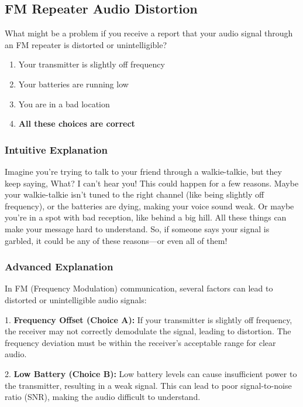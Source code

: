 \subsection{FM Repeater Audio Distortion}
\label{T7B10}

\begin{tcolorbox}[colback=gray!10!white,colframe=black!75!black,title=T7B10]
What might be a problem if you receive a report that your audio signal through an FM repeater is distorted or unintelligible?
\begin{enumerate}[label=\Alph*]
    \item Your transmitter is slightly off frequency
    \item Your batteries are running low
    \item You are in a bad location
    \item \textbf{All these choices are correct}
\end{enumerate}
\end{tcolorbox}

\subsubsection{Intuitive Explanation}
Imagine you're trying to talk to your friend through a walkie-talkie, but they keep saying, What? I can't hear you! This could happen for a few reasons. Maybe your walkie-talkie isn't tuned to the right channel (like being slightly off frequency), or the batteries are dying, making your voice sound weak. Or maybe you're in a spot with bad reception, like behind a big hill. All these things can make your message hard to understand. So, if someone says your signal is garbled, it could be any of these reasons—or even all of them!

\subsubsection{Advanced Explanation}
In FM (Frequency Modulation) communication, several factors can lead to distorted or unintelligible audio signals:

1. \textbf{Frequency Offset (Choice A):} If your transmitter is slightly off frequency, the receiver may not correctly demodulate the signal, leading to distortion. The frequency deviation must be within the receiver's acceptable range for clear audio.

2. \textbf{Low Battery (Choice B):} Low battery levels can cause insufficient power to the transmitter, resulting in a weak signal. This can lead to poor signal-to-noise ratio (SNR), making the audio difficult to understand.

